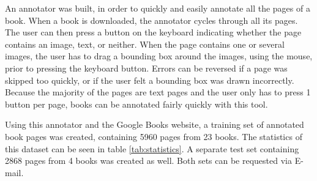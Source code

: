 \label{sec:annotator}

An annotator was built, in order to quickly and easily annotate all the pages of
a book. When a book is downloaded, the annotator cycles through all its pages.
The user can then press a button on the keyboard indicating whether the page
contains an image, text, or neither. When the page contains one or several
images, the user has to drag a bounding box around the images, using the mouse,
prior to pressing the keyboard button. Errors can be reversed if a page was
skipped too quickly, or if the user felt a bounding box was drawn incorrectly.
Because the majority of the pages are
text pages and the user only has to press 1 button per page, books can be
annotated fairly quickly with this tool.

Using this annotator and the Google Books website, a training set of annotated
book pages was created, containing 5960 pages from 23 books. The statistics of
this dataset can be seen in table \ref{tab:statistics}. A separate test set
containing 2868 pages from 4 books was created as well. Both sets can be
requested via E-mail.
